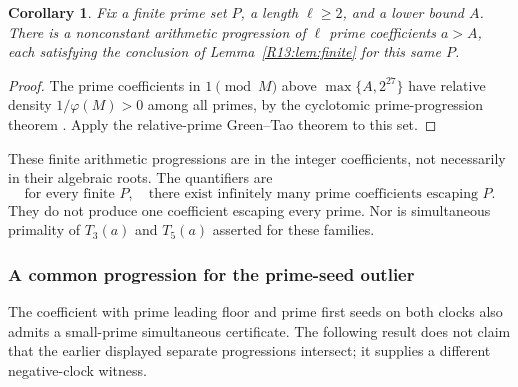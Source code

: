 \documentclass[11pt,a4paper]{article}
\newtheorem{corollary}[theorem]{Corollary}\newtheorem{mainthm}[theorem]{Theorem}
\theoremstyle{definition}\newtheorem{definition}[theorem]{Definition}
\theoremstyle{remark}\newtheorem{remark}[theorem]{Remark}
\begin{document}
\begin{corollary}\label{R13:cor:GT}
Fix a finite prime set $P$, a length $\ell\ge2$, and a lower bound $A$.
There is a nonconstant arithmetic progression of $\ell$ prime
coefficients $a>A$, each satisfying the conclusion of
Lemma~\ref{R13:lem:finite} for this same $P$.
\end{corollary}

\begin{proof}
The prime coefficients in $1\pmod M$ above
$\max\{A,2^{27}\}$ have relative density $1/\varphi(M)>0$
among all primes, by the cyclotomic prime-progression theorem
\cite{Lenstra}. Apply the relative-prime Green--Tao theorem
\cite[Theorem~1.2]{GreenTao} to this set.
\end{proof}

These finite arithmetic progressions are in the integer coefficients,
not necessarily in their algebraic roots.
The quantifiers are
\[
 \text{for every finite }P,\quad
 \text{there exist infinitely many prime coefficients escaping }P.
\]
They do not produce one coefficient escaping every prime.
Nor is simultaneous primality of $T_3(a)$ and $T_5(a)$ asserted
for these families.

\subsubsection{A common progression for the prime-seed outlier}
\label{R13:syn:outlier-common}

The coefficient with prime leading floor and prime first seeds on both
clocks also admits a small-prime simultaneous certificate. The following
result does not claim that the earlier displayed separate progressions
intersect; it supplies a different negative-clock witness.
\end{document}
